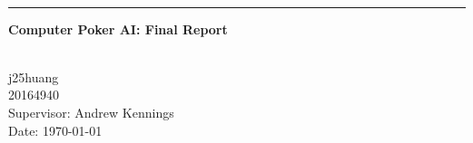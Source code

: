 \begin{titlepage}
\begin{center}


      \huge \textbf{\thetitle}
\\[0.30em]	  {\hrule height0.02em}

\vspace{0.5em}
	\Large \textbf{Computer Poker AI: Final Report}

    \vfill
    \small
	\textbf{\theauthor}
\\[1.2em]
    
	j25huang
	\\20164940
\\[3em]
	
	Supervisor: Andrew Kennings
    \\Date: \today


\end{center}
\end{titlepage}
\clearpage
